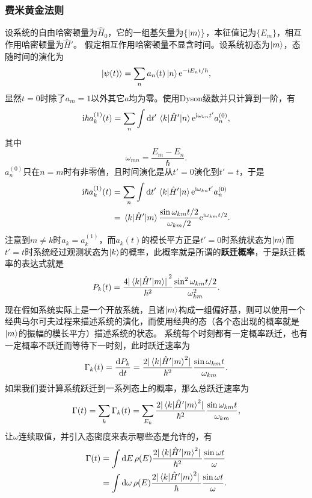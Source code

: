\documentclass[UTF8, a4paper]{ctexart}
\newcommand*{\ii}{\mathrm{i}}
\newcommand*{\ee}{\mathrm{e}}
\begin{document}
\subsubsection{费米黄金法则}

设系统的自由哈密顿量为$\hat{H}_0$，它的一组基矢量为$\{\ket{m}\}$，本征值记为$\{E_m\}$，相互作用哈密顿量为$\hat{H}'$。
假定相互作用哈密顿量不显含时间。设系统初态为$\ket{m}$，态随时间的演化为
\[
    \ket{\psi(t)} = \sum_n a_n(t) \ket{n} \ee^{- \ii E_n t / \hbar},
\]
显然$t=0$时除了$a_m=1$以外其它$a$均为零。使用Dyson级数并只计算到一阶，有
\[
    \ii \hbar a^{(1)}_k(t) = \sum_n \int \dd{t'} \mel{k}{\hat{H}'}{n} \ee^{\ii \omega_{kn} t'} a_n^{(0)},
\]
其中
\[
    \omega_{mn} = \frac{E_m - E_n}{\hbar}.
\]
$a_n^{(0)}$只在$n=m$时有非零值，且时间演化是从$t'=0$演化到$t'=t$，于是
\[
    \begin{aligned}
        \ii \hbar a^{(1)}_k(t) &= \sum_n \int \dd{t'} \mel{k}{\hat{H}'}{n} \ee^{\ii \omega_{kn} t'} a_n^{(0)} \\
        &= \mel{k}{\hat{H}'}{m} \frac{\sin \omega_{km} t / 2}{\omega_{km} / 2} \ee^{\ii \omega_{km} t / 2}. 
    \end{aligned}
\]
注意到$m \neq k$时$a_k = a_k^{(1)}$，而$a_k(t)$的模长平方正是$t'=0$时系统状态为$\ket{m}$而$t'=t$时系统经过观测状态为$\ket{k}$的概率，此概率就是所谓的\textbf{跃迁概率}，于是跃迁概率的表达式就是
\begin{equation}
    P_k(t) = \frac{4 \abs*{\mel{k}{\hat{H}'}{m}}^2}{\hbar^2} \frac{\sin^2 \omega_{km} t / 2}{\omega_{km}^2}.
\end{equation}
现在假如系统实际上是一个开放系统，且诸$\ket{m}$构成一组偏好基，则可以使用一个经典马尔可夫过程来描述系统的演化，而使用经典的态（各个态出现的概率就是$\ket{m}$的振幅的模长平方）描述系统的状态。
系统每个时刻都有一定概率跃迁，也有一定概率不跃迁而等待下一时刻，此时跃迁速率为%
\begin{equation}
    \Gamma_k(t) = \dv{P_k}{t} = \frac{2 \abs*{\mel{k}{\hat{H}'}{m}^2}}{\hbar^2} \frac{\sin \omega_{km} t}{\omega_{km}}.
\end{equation}
如果我们要计算系统跃迁到一系列态上的概率，那么总跃迁速率为
\[
    \Gamma(t) = \sum_k \Gamma_k(t) = \sum_{E_k} \frac{2 \abs*{\mel{k}{\hat{H}'}{m}^2}}{\hbar^2} \frac{\sin \omega_{km} t}{\omega_{km}},
\]
让$\omega$连续取值，并引入态密度来表示哪些态是允许的，有
\begin{equation}
    \begin{aligned}
        \Gamma(t) &= \int \dd{E} \rho(E) \frac{2 \abs*{\mel{k}{\hat{H}'}{m}^2}}{\hbar^2} \frac{\sin \omega t}{\omega} \\
        &= \int \dd{\omega} \rho(E) \frac{2 \abs*{\mel{k}{\hat{H}'}{m}^2}}{\hbar} \frac{\sin \omega t}{\omega}.
    \end{aligned}
\end{equation}
\end{document}

